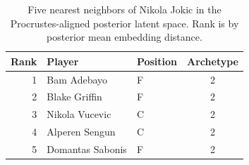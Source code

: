 \begin{table}[htbp]
  \centering\small
  \begin{tabular}{rllc}
    \toprule
    Rank & Player & Position & Archetype \\
    \midrule
    1 & Bam Adebayo & F & 2 \\
    2 & Blake Griffin & F & 2 \\
    3 & Nikola Vucevic & C & 2 \\
    4 & Alperen Sengun & C & 2 \\
    5 & Domantas Sabonis & F & 2 \\
    \bottomrule
  \end{tabular}
  \caption{Five nearest neighbors of Nikola Jokic in the Procrustes-aligned posterior latent space. Rank is by posterior mean embedding distance.}
  \label{tab:Nikola_Jokic_neighbors}
\end{table}

